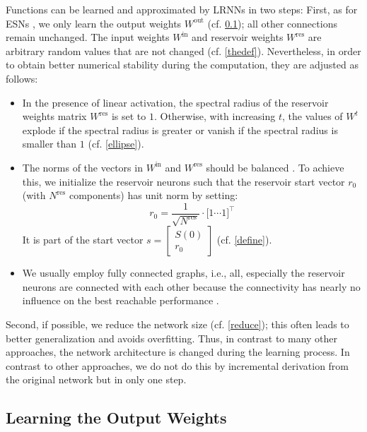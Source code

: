 \documentclass[twoside,11pt]{article}
\theoremstyle{definition}
\begin{document}
Functions can be learned and approximated by LRNNs in two steps: First, as for
ESNs \citep{JH04}, we only learn the output weights $W^\mathrm{out}$ (cf.
\cref{output}); all other connections remain unchanged. The input weights
$W^\mathrm{in}$ and reservoir weights $W^\mathrm{res}$ are arbitrary random
values that are not changed (cf. \cref{thedef}). Nevertheless, in order to
obtain better numerical stability during the computation, they are adjusted as
follows:
\begin{itemize}
  \item In the presence of linear activation, the spectral radius of the
	reservoir weights matrix $W^\mathrm{res}$ is set to $1$.
	Otherwise, with increasing $t$, the values of $W^t$ explode if the
	spectral radius is greater or vanish if the spectral radius is smaller
	than $1$ (cf. \cref{ellipse}).
  \item The norms of the vectors in $W^\mathrm{in}$ and $W^\mathrm{res}$ should
        be balanced \citep{KLB12}. To achieve this, we initialize the reservoir
        neurons such that the reservoir start vector $r_0$ (with $N^\mathrm{res}$
        components) has unit norm by
        setting:
	\[ r_0 = \frac{1}{\sqrt{N^\mathrm{res}}} \cdot \big[ 1 \cdots 1 \big]^\top \]
	It is part of the start vector $s = \left[ \begin{array}{c} S(0) \\ r_0
	\end{array} \right]$ (cf. \cref{define}).
  \item We usually employ fully connected graphs, i.e., all, especially the
	reservoir neurons are connected with each other because the
	connectivity has nearly no influence on the best reachable performance
	\citep{KLB12}.
\end{itemize}
Second, if possible, we reduce the network size (cf. \cref{reduce});
this often leads to better generalization and avoids overfitting. Thus, in
contrast to many other approaches, the network architecture is changed during
the learning process. In contrast to other approaches, we do not do this by
incremental derivation from the original network but in only one step.

\subsection{Learning the Output Weights}\label{output}
\end{document}
